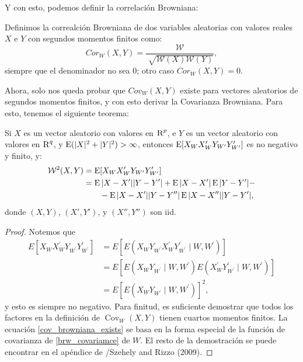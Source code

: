 		Y con esto, podemos definir la correlaci\'on Browniana:
		
		\begin{defn}
			Definimos la correalci\'on Browniana de dos variables aleatorias con valores reales $X$ e $Y$ con segundos momentos finitos como:
			\begin{equation}	
				Cor_W(X,Y) = \frac{\mathcal{W}}{\sqrt[]{\mathcal{W}(X)\mathcal{W}(Y)}},
			\end{equation}
			siempre que el denominador no sea 0; otro caso $Cor_W(X,Y) = 0$.
		\end{defn}

		Ahora, solo nos queda probar que $Cov_W(X,Y)$ existe para vectores aleatorios de segundos momentos finitos, y con esto derivar la Covarianza Browniana. Para esto, tenemos el siguiente teorema:

		\begin{thm}\label{thm_exists_cov_browniana}
			Si $X$ es un vector aleatorio con valores en $\textsc{R}^p$, e $Y$ es un vector aleatorio con valores en $\textsc{R}^q$, y $\operatorname{E}(|X|^2+|Y|^2)>\infty$, entonces $\operatorname{E}[X_{W}X'_{W}Y_{W'}Y'_{W'}]$ es no negativo y finito, y:
			\begin{align}
				\mathcal{W}^2(X,Y) &= \operatorname{E}[X_{W}X'_{W}Y_{W'}Y'_{W'}]\\
								   &= \operatorname{E}|X-X'||Y-Y'| + \operatorname{E}|X-X'|\operatorname{E}|Y-Y'| - \label{cov_browniana_exists} \\ 
								   &\qquad - \operatorname{E}|X-X'||Y-Y''|\operatorname{E}|X-X''||Y-Y'|,\label{eq_37_brcov}
 			\end{align}
			donde $(X,Y)$, $(X',Y')$, y $(X'',Y'')$ son iid.
		\end{thm}
		\begin{proof}
			Notemos que
			$$
			\begin{aligned}
			E\left[X_W X_W^{\prime} Y_{W^{\prime}} Y_{W^{\prime}}^{\prime}\right] & =E\left[E\left(X_W Y_{W^{\prime}} X_W^{\prime} Y_{W^{\prime}}^{\prime} \mid W, W^{\prime}\right)\right] \\
			& =E\left[E\left(X_W Y_{W^{\prime}} \mid W, W^{\prime}\right) E\left(X_W^{\prime} Y_{W^{\prime}}^{\prime} \mid W, W^{\prime}\right)\right] \\
			& =E\left[E\left(X_W Y_{W^{\prime}} \mid W, W^{\prime}\right)\right]^2,
			\end{aligned}
			$$
			y esto es siempre no negativo. Para finitud, es suficiente demostrar que todos los factores en la definici\'on de  $\operatorname{Cov}_W(X, Y)$ tienen cuartos momentos finitos. La ecuaci\'on \ref{cov_browniana_exists} se basa en la forma especial de la funci\'on de covarianza de \ref{brw_covariamce} de $W$. El resto de la demostraci\'on se puede encontrar en el ap\'endice de /Szehely and Rizzo (2009)\cite{Szekely2009}.	
		\end{proof}

